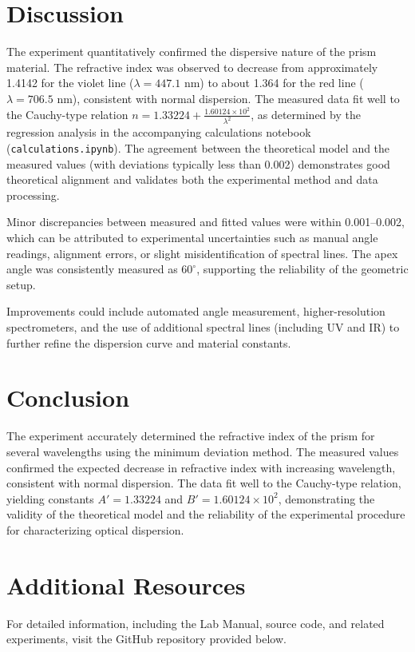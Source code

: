 \documentclass[journal]{IEEEtran}
\begin{document}
\section{Discussion}
The experiment quantitatively confirmed the dispersive nature of the prism material. The refractive index was observed to decrease from approximately 1.4142 for the violet line (\( \lambda = 447.1 \) nm) to about 1.364 for the red line (\( \lambda = 706.5 \) nm), consistent with normal dispersion. The measured data fit well to the Cauchy-type relation \( n = 1.33224 + \frac{1.60124 \times 10^2}{\lambda^2} \), as determined by the regression analysis in the accompanying calculations notebook (\texttt{calculations.ipynb}). The agreement between the theoretical model and the measured values (with deviations typically less than 0.002) demonstrates good theoretical alignment and validates both the experimental method and data processing.

Minor discrepancies between measured and fitted values were within 0.001–0.002, which can be attributed to experimental uncertainties such as manual angle readings, alignment errors, or slight misidentification of spectral lines. The apex angle was consistently measured as \( 60^\circ \), supporting the reliability of the geometric setup.

Improvements could include automated angle measurement, higher-resolution spectrometers, and the use of additional spectral lines (including UV and IR) to further refine the dispersion curve and material constants.
\section{Conclusion}
The experiment accurately determined the refractive index of the prism for several wavelengths using the minimum deviation method. The measured values confirmed the expected decrease in refractive index with increasing wavelength, consistent with normal dispersion. The data fit well to the Cauchy-type relation, yielding constants \( A' = 1.33224 \) and \( B' = 1.60124 \times 10^2 \), demonstrating the validity of the theoretical model and the reliability of the experimental procedure for characterizing optical dispersion.

\section{Additional Resources}
For detailed information, including the Lab Manual, source code, and related experiments, visit the GitHub repository provided below.
\end{document}

